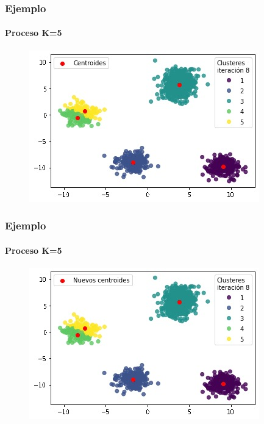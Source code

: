 \documentclass[
  shownotes,
  xcolor={svgnames},
  hyperref={colorlinks,citecolor=DarkBlue,linkcolor=DarkRed,urlcolor=DarkBlue}
  , aspectratio=169]{beamer}
\begin{document}
\begin{frame}
\frametitle{Ejemplo}
\framesubtitle{Proceso K=5}


\begin{figure}[H] \centering

    \centering
    \includegraphics[scale=.7]{figures/k5_13.jpg}
  \\
  \tiny
\end{figure}


\end{frame}
\begin{frame}
\frametitle{Ejemplo}
\framesubtitle{Proceso K=5}


\begin{figure}[H] \centering

    \centering
    \includegraphics[scale=.7]{figures/k5_14.jpg}
  \\
  \tiny
\end{figure}


\end{frame}
\end{document}
